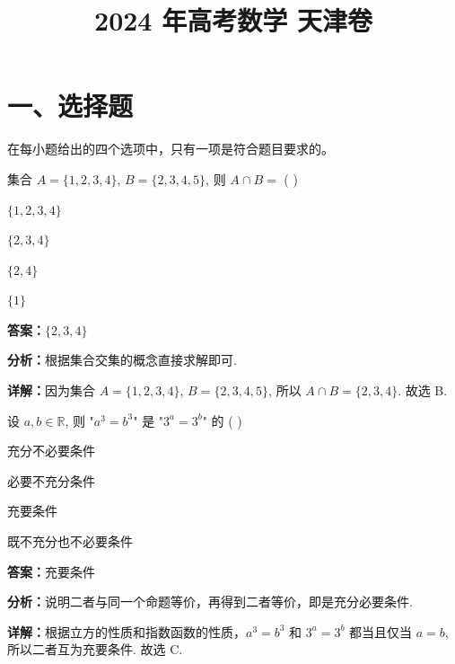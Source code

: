 ﻿\title{2024 年高考数学 天津卷}
\date{}
\maketitle

\section*{一、选择题}
在每小题给出的四个选项中，只有一项是符合题目要求的。

\begin{question}[points=5]
集合 $A = \{1,2,3,4\}$, $B = \{2,3,4,5\}$, 则 $A \cap B =$ ( )
\begin{choices}
  \item $\{1,2,3,4\}$
  \item $\{2,3,4\}$
  \item $\{2,4\}$
  \item $\{1\}$
\end{choices}
\begin{solution}
\textbf{答案：}$\{2,3,4\}$

\textbf{分析：}根据集合交集的概念直接求解即可.

\textbf{详解：}因为集合 $A = \{1,2,3,4\}$, $B = \{2,3,4,5\}$, 所以 $A \cap B = \{2,3,4\}$. 故选 B.
\end{solution}
\end{question}

\begin{question}[points=5]
设 $a,b \in \mathbb{R}$, 则 "$a^3 = b^3$" 是 "$3^a = 3^b$" 的 ( )
\begin{choices}
  \item 充分不必要条件
  \item 必要不充分条件
  \item 充要条件
  \item 既不充分也不必要条件
\end{choices}
\begin{solution}
\textbf{答案：}充要条件

\textbf{分析：}说明二者与同一个命题等价，再得到二者等价，即是充分必要条件.

\textbf{详解：}根据立方的性质和指数函数的性质，$a^3 = b^3$ 和 $3^a = 3^b$ 都当且仅当 $a = b$, 所以二者互为充要条件. 故选 C.
\end{solution}
\end{question}

